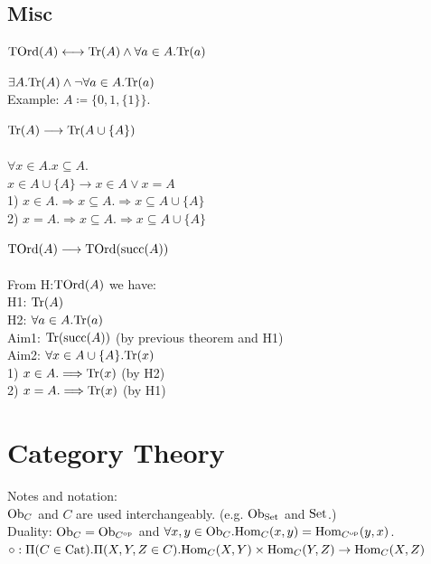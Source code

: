 \documentclass[10pt,a4paper]{article}
\begin{document}
\subsection{Misc}
\begin{definition}
${\textrm{TOrd}}(A) \longleftrightarrow {\textrm{Tr}}(A)\land \forall a\in A. {\textrm{Tr}}(a)$
\end{definition}
\begin{theorem}
$\exists A. {\textrm{Tr}}(A) \land \neg \forall a\in A. {\textrm{Tr}}(a)$
\\Example: $A\coloneqq \{0, 1, \{1\}\}$.
\end{theorem}
\begin{theorem}
${\textrm{Tr}}(A) \longrightarrow {\textrm{Tr}}(A\cup\{A\})$
\\\myprf
\\$\forall x\in A.x\subseteq A.$
\\$x\in A\cup\{A\} \longrightarrow x\in A \lor x=A$
\\1) $x\in A. \Longrightarrow x\subseteq A. \Longrightarrow x\subseteq A\cup\{A\}$
\\2) $x = A. \Longrightarrow x\subseteq A. \Longrightarrow x\subseteq A\cup\{A\}$
\\\myqed
\end{theorem}
\begin{theorem}
  $ {\textrm{TOrd}}(A) \longrightarrow {\textrm{TOrd}}({\textrm{succ}}(A))$
\\\myprf
\\From H:${\textrm{TOrd}}(A)$ we have:
\\H1: ${\textrm{Tr}}(A)$
\\H2: $\forall a\in A. {\textrm{Tr}}(a)$
\\Aim1: ${\textrm{Tr}}({\textrm{succ}}(A))$ (by previous theorem and H1)
\\Aim2: $\forall x\in A\cup\{A\}. {\textrm{Tr}}(x)$
\\1) $x\in A. \Longrightarrow {\textrm{Tr}}(x)$ (by H2)
\\2) $x = A. \Longrightarrow {\textrm{Tr}}(x)$ (by H1) %
\\\myqed
\end{theorem}
\section{Category Theory}
Notes and notation:\\
${\textrm{Ob}}_C$ and $C$ are used interchangeably. (e.g. ${\textrm{Ob}}_{\textrm{Set}}$ and ${\textrm{Set}}$.)\\
Duality: ${\textrm{Ob}}_C = {\textrm{Ob}}_{C^{\textrm{op}}}$ and 
 $\forall x,y \in {\textrm{Ob}}_C. {\textrm{Hom}}_C(x,y) = {\textrm{Hom}}_{C^{\textrm{op}}}(y,x)$.\\
$\circ : \Pi(C\in {\textrm{Cat}}).\Pi(X,Y,Z\in C).{\textrm{Hom}}_C(X,Y)\times{\textrm{Hom}}_C(Y,Z)\to{\textrm{Hom}}_C(X,Z)$
\end{document}
